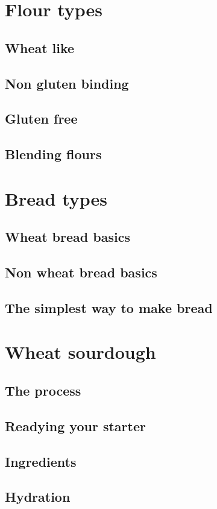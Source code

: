 \documentclass[a4paper, 12pt]{book}
\begin{document}
\chapter{Flour types}
\section{Wheat like}
\section{Non gluten binding}
\section{Gluten free}
\section{Blending flours}

\chapter{Bread types}
\section{Wheat bread basics}
\section{Non wheat bread basics}
\section{The simplest way to make bread}

\chapter{Wheat sourdough}
\section{The process}
\section{Readying your starter}
\section{Ingredients}
\section{Hydration}
\end{document}
